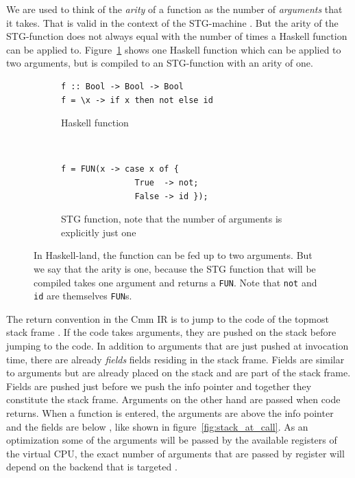 We are used to think of the \emph{arity} of a function as the number
of \emph{arguments} that it takes. That is valid in the context
of the STG-machine \cite{commentary_function_calls}. But the arity
of the STG-function does not always equal with the number of times
a Haskell function can be applied to. Figure~\ref{fig:tricky_arity}
shows one Haskell function which can be applied to two arguments, but
is compiled to an STG-function with an arity of one.

\begin{figure}
\begin{mdframed}
        \begin{subfigure}[t]{0.5\textwidth}
          \begin{verbatim}
f :: Bool -> Bool -> Bool
f = \x -> if x then not else id
          \end{verbatim}
          \caption{Haskell function}
        \end{subfigure}
    ~ %
        \begin{subfigure}[t]{0.5\textwidth}
          \begin{verbatim}
f = FUN(x -> case x of {
               True  -> not;
               False -> id });
          \end{verbatim}
          \caption{STG function, note that the number of arguments is
explicitly just one}
        \end{subfigure}
  \caption{In Haskell-land, the function can be fed up to two arguments.
  But we say that the arity is one, because the STG function that will be
  compiled takes one argument and returns a \texttt{FUN}. Note that \texttt{not}
  and \texttt{id} are themselves \texttt{FUN}s.
 }
  \label{fig:tricky_arity}
\end{mdframed}
\end{figure}

The return convention in the Cmm IR is to jump to the code of the
topmost stack frame \cite{commentary_return_convention}. If the code
takes arguments, they are pushed on the stack before jumping to the
code. In addition to arguments that are just pushed at invocation time, there
are already \emph{fields} fields residing in the stack frame. Fields are
similar to arguments but are already placed on the stack and are part of
the stack frame. Fields are pushed just before we push the info pointer and
together they constitute the stack frame. Arguments on the other hand are
passed when code returns.
When a function is entered, the arguments are above the
info pointer and the fields are below \cite{github_stack_at_call}, like
shown in figure~\ref{fig:stack_at_call}. As an optimization some of the
arguments will be passed by the available registers of the virtual CPU,
the exact number of arguments that are passed by register will depend on
the backend that is targeted \cite{github_mach_regs_h}.

